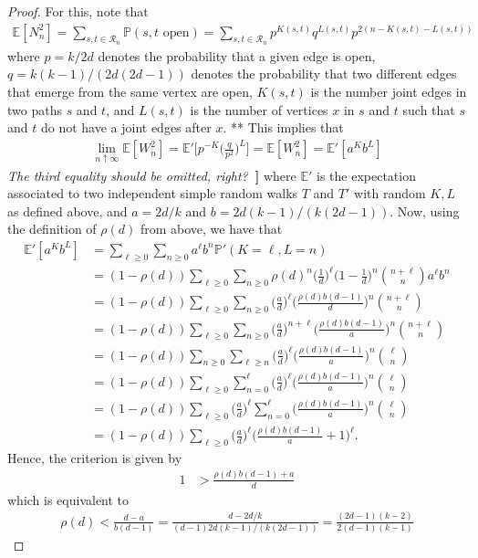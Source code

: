 \documentclass{article}
\theoremstyle{definition}
\renewcommand{\P}{\mathbb{P}}
\newcommand{\1}{\mathbbm{1}}
\newcommand{\E}{\mathbb{E}}
\newcommand{\0}{\mathbf{o}}
\newcommand{\basc}[1]{{\color{blue}{ \bf [~Bas:\ }\emph{#1}\textbf{~]}}}
\begin{document}
\begin{proof}
For this, note that 
\begin{align*}
\E[N_n^2]=\sum_{s,t\in \mathcal R_n}\P(s,t\text{ open})=\sum_{s,t\in \mathcal R_n}p^{K(s,t)}q^{L(s,t)}p^{2(n-K(s,t)-L(s,t))}
\end{align*}
where $p=k/2d$ denotes the probability that a given edge is open, $q=k(k-1)/(2d(2d-1))$ denotes the probability that two different edges that emerge from the same vertex are open, $K(s,t)$ is the number joint edges in two paths $s$ and $t$, and $L(s,t)$ is the number of vertices $x$ in $s$ and $t$ such that $s$ and $t$ do not have a joint edges after $x$. \color{green} ** \color{black} This implies that 
\begin{align*}
\lim_{n\uparrow\infty}\E[W_n^2]=\E'\Big[p^{-K}\Big(\frac{q}{p^2}\Big)^L\Big]=\E[W_n^2]=\E'[a^Kb^L]
\end{align*}
\basc{The third equality should be omitted, right?}
where $\E'$ is the expectation associated to two independent simple random walks $T$ and $T'$ with random $K,L$ as defined above, and $a=2d/k$ and $b=2d(k-1)/(k(2d-1))$. Now, using the definition of $\rho(d)$ from above, we have that 
\begin{align*}
\E'[a^Kb^L]&=\sum_{\ell\ge 0}\sum_{n\ge 0}a^\ell b^n\P'(K=\ell,L=n)\\
&=(1-\rho(d))\sum_{\ell\ge 0}\sum_{n\ge 0}\rho(d)^n\Big(\frac{1}{d}\Big)^\ell\Big(1-\frac{1}{d}\Big)^n\binom{n+\ell}{n}a^\ell b^n\\
&=(1-\rho(d))\sum_{\ell\ge 0}\sum_{n\ge 0}\Big(\frac{a}{d}\Big)^\ell\Big(\frac{\rho(d)b(d-1)}{d}\Big)^n\binom{n+\ell}{n}\\
&=(1-\rho(d))\sum_{\ell\ge 0}\sum_{n\ge 0}\Big(\frac{a}{d}\Big)^{n+\ell}\Big(\frac{\rho(d)b(d-1)}{a}\Big)^n\binom{n+\ell}{n}\\
&=(1-\rho(d))\sum_{n\ge 0}\sum_{\ell\ge n}\Big(\frac{a}{d}\Big)^{\ell}\Big(\frac{\rho(d)b(d-1)}{a}\Big)^n\binom{\ell}{n}\\
&=(1-\rho(d))\sum_{\ell\ge 0}\sum_{n=0}^\ell\Big(\frac{a}{d}\Big)^{\ell}\Big(\frac{\rho(d)b(d-1)}{a}\Big)^n\binom{\ell}{n}\\
&=(1-\rho(d))\sum_{\ell\ge 0}\Big(\frac{a}{d}\Big)^{\ell}\sum_{n=0}^\ell\Big(\frac{\rho(d)b(d-1)}{a}\Big)^n\binom{\ell}{n}\\
&=(1-\rho(d))\sum_{\ell\ge 0}\Big(\frac{a}{d}\Big)^{\ell}\Big(\frac{\rho(d)b(d-1)}{a}+1\Big)^\ell.
\end{align*}
Hence, the criterion is given by 
\begin{align*}
1&>\frac{\rho(d)b(d-1)+a}{d}
\end{align*}
which is equivalent to
\begin{align*}
\rho(d)<\frac{d-a}{b(d-1)}=\frac{d-2d/k}{(d-1)2d(k-1)/(k(2d-1))}=\frac{(2d-1)(k-2)}{2(d-1)(k-1)}
\end{align*}
\end{proof}
\end{document}
